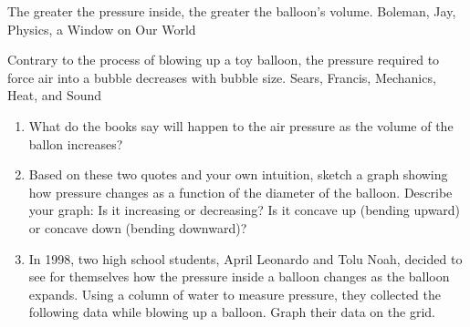 \documentclass[10pt,]{book}
\theoremstyle{plain}
\theoremstyle{definition}
\theoremstyle{definition}
\theoremstyle{definition}
\theoremstyle{definition}
\theoremstyle{definition}
\numberwithin{equation}{section}
\begin{document}
    The greater the pressure inside, the greater the balloon’s volume. Boleman, Jay, Physics, a Window on Our World
%
\par

    Contrary to the process of blowing up a toy balloon, the pressure required to force air into a bubble decreases with bubble size. Sears, Francis, Mechanics, Heat, and Sound
%
\leavevmode%
\begin{enumerate}
\item\hypertarget{li-390}{}What do the books say will happen to the air pressure as the volume of the ballon increases?
    \item\hypertarget{li-391}{}
            Based on these two quotes and your own intuition, sketch a graph showing how pressure changes as a function of the diameter of the balloon. Describe your graph: Is it increasing or decreasing? Is it concave up (bending upward) or concave down (bending downward)?
        \item\hypertarget{li-392}{}In 1998, two high school students, April Leonardo and Tolu Noah, decided to see for themselves how the pressure inside a balloon changes as the balloon expands. Using a column of water to measure pressure, they collected the following data while blowing up a balloon. Graph their data on the grid.


\end{enumerate}
\end{document}
